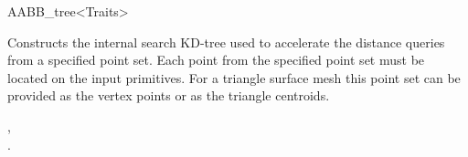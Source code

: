 \begin{ccRefClass}{AABB_tree<Traits>}
\begin{ccAdvanced}
{ Constructs the internal search KD-tree used to accelerate the distance queries from a specified point set. Each point from the specified point set must be located on the input primitives. For a triangle surface mesh this point set can be provided as the vertex points or as the triangle centroids.}
\end{ccAdvanced}

\ccSeeAlso

, \\
.

\end{ccRefClass}

\ccRefPageEnd

